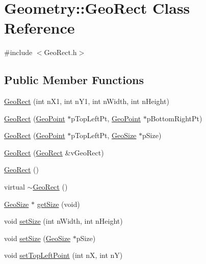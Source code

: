 \hypertarget{class_geometry_1_1_geo_rect}{\section{Geometry\+:\+:Geo\+Rect Class Reference}
\label{class_geometry_1_1_geo_rect}
}


{\ttfamily \#include $<$Geo\+Rect.\+h$>$}

\subsection*{Public Member Functions}
\begin{DoxyCompactItemize}
\item 
\hyperlink{class_geometry_1_1_geo_rect_a9820f510a951315831b4c385b4dd5f7f}{Geo\+Rect} (int n\+X1, int n\+Y1, int n\+Width, int n\+Height)
\item 
\hyperlink{class_geometry_1_1_geo_rect_ad6e348652bc62dc5198b7ac26aa2d177}{Geo\+Rect} (\hyperlink{class_geometry_1_1_geo_point}{Geo\+Point} $\ast$p\+Top\+Left\+Pt, \hyperlink{class_geometry_1_1_geo_point}{Geo\+Point} $\ast$p\+Bottom\+Right\+Pt)
\item 
\hyperlink{class_geometry_1_1_geo_rect_ad26a503538fd77191ba71ad884a4b46e}{Geo\+Rect} (\hyperlink{class_geometry_1_1_geo_point}{Geo\+Point} $\ast$p\+Top\+Left\+Pt, \hyperlink{class_geometry_1_1_geo_size}{Geo\+Size} $\ast$p\+Size)
\item 
\hyperlink{class_geometry_1_1_geo_rect_a3cc5173f88ded3b105e1c7ea7d551cd4}{Geo\+Rect} (\hyperlink{class_geometry_1_1_geo_rect}{Geo\+Rect} \&v\+Geo\+Rect)
\item 
\hyperlink{class_geometry_1_1_geo_rect_a3c0d278b693d72e695a01150492d11bb}{Geo\+Rect} ()
\item 
virtual \hyperlink{class_geometry_1_1_geo_rect_aef8f44244cf2ace1846e9406d22ed290}{$\sim$\+Geo\+Rect} ()
\item 
\hyperlink{class_geometry_1_1_geo_size}{Geo\+Size} $\ast$ \hyperlink{class_geometry_1_1_geo_rect_a31afdf267816f65dbad8633ff1298394}{get\+Size} (void)
\item 
void \hyperlink{class_geometry_1_1_geo_rect_a4043826e979ef681f21318c5aa5a975e}{set\+Size} (int n\+Width, int n\+Height)
\item 
void \hyperlink{class_geometry_1_1_geo_rect_a51b0a80ba81aaad8092488d02d3dfde5}{set\+Size} (\hyperlink{class_geometry_1_1_geo_size}{Geo\+Size} $\ast$p\+Size)
\item 
void \hyperlink{class_geometry_1_1_geo_rect_a27ca9d13cceb4bfee56a2294e2b7fe6d}{set\+Top\+Left\+Point} (int n\+X, int n\+Y)

\end{DoxyCompactItemize}
